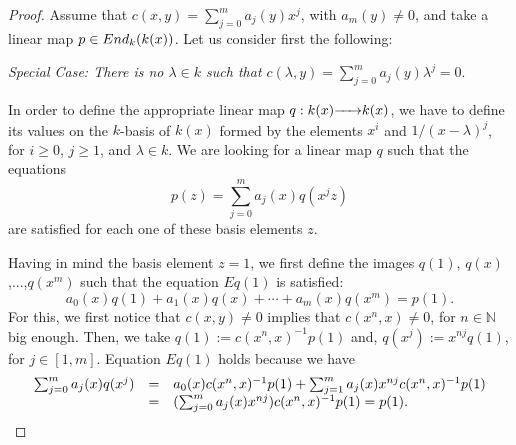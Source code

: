 \documentclass[10pt,a4paper]{amsart}
\newcommand{\End}{{ \rm End }}
\newcommand{\hueca}[1]{\mathbb{#1}}
\newcommand{\rightmap}[1]{\smash{\mathop{\hbox to 
20pt{\rightarrowfill}}\limits^{#1}}}
\begin{document}
\begin{proof} Assume that $c(x,y)=\sum_{j=0}^ma_j(y)x^j$, with $a_m(y)\not=0$, and take a linear map $p\in \End_k(k(x))$. Let us consider first the following:
\medskip

\noindent\emph{Special Case: There is no $\lambda\in k$ such that 
$c(\lambda,y)=\sum_{j=0}^ma_j(y)\lambda^j=0.$}
\medskip


In order to define the appropriate linear map $q:k(x)\rightmap{}k(x)$, we have to define its values on the $k$-basis of $k(x)$ formed by the elements $x^i$ and $1/(x-\lambda)^j$, for $i\geq 0$, $j\geq 1$, and $\lambda\in k$. We are looking for a linear map $q$ such that the equations 
\begin{equation}\tag{$Eq(z)$}
 p(z)=\sum_{j=0}^ma_j(x)q(x^jz)
\end{equation}
 are satisfied for each one of these basis elements $z$. 



Having in mind the basis element $z=1$, we first define the images $q(1)$, $q(x)$,...,$q(x^m)$ such that the equation $Eq(1)$ is satisfied:   
$$a_0(x)q(1)+a_1(x)q(x)+\cdots+a_m(x)q(x^m)=p(1).$$
For this, we first notice that $c(x,y)\not=0$ implies that $c(x^n,x)\not=0$, for $n\in \hueca{N}$ big enough. Then, we take $q(1):=c(x^n,x)^{-1}p(1)$ and, $q(x^j):=x^{nj}q(1)$, for $j\in [1,m]$. Equation $Eq(1)$ holds because  we have 
$$\begin{matrix}
\sum_{j=0}^ma_j(x)q(x^j)&=&a_0(x)c(x^n,x)^{-1} p(1)+\sum_{j=1}^ma_j(x)x^{nj}c(x^n,x)^{-1}p(1)\hfill\\
&=&
(\sum_{j=0}^ma_j(x)x^{nj})c(x^n,x)^{-1}p(1)=p(1).\hfill\\
\end{matrix}$$


\end{proof}
\end{document}
